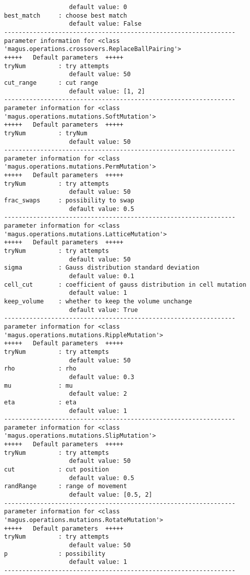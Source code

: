 \documentclass[12pt,oneside]{book}
\begin{document}
\begin{tcolorbox}
\begin{verbatim}
                  default value: 0
best_match     : choose best match
                  default value: False
----------------------------------------------------------------
parameter information for <class 'magus.operations.crossovers.ReplaceBallPairing'>
+++++	Default parameters	+++++
tryNum         : try attempts
                  default value: 50
cut_range      : cut range
                  default value: [1, 2]
----------------------------------------------------------------
parameter information for <class 'magus.operations.mutations.SoftMutation'>
+++++	Default parameters	+++++
tryNum         : tryNum
                  default value: 50
----------------------------------------------------------------
parameter information for <class 'magus.operations.mutations.PermMutation'>
+++++	Default parameters	+++++
tryNum         : try attempts
                  default value: 50
frac_swaps     : possibility to swap
                  default value: 0.5
----------------------------------------------------------------
parameter information for <class 'magus.operations.mutations.LatticeMutation'>
+++++	Default parameters	+++++
tryNum         : try attempts
                  default value: 50
sigma          : Gauss distribution standard deviation
                  default value: 0.1
cell_cut       : coefficient of gauss distribution in cell mutation
                  default value: 1
keep_volume    : whether to keep the volume unchange
                  default value: True
----------------------------------------------------------------
parameter information for <class 'magus.operations.mutations.RippleMutation'>
+++++	Default parameters	+++++
tryNum         : try attempts
                  default value: 50
rho            : rho
                  default value: 0.3
mu             : mu
                  default value: 2
eta            : eta
                  default value: 1
----------------------------------------------------------------
parameter information for <class 'magus.operations.mutations.SlipMutation'>
+++++	Default parameters	+++++
tryNum         : try attempts
                  default value: 50
cut            : cut position
                  default value: 0.5
randRange      : range of movement
                  default value: [0.5, 2]
----------------------------------------------------------------
parameter information for <class 'magus.operations.mutations.RotateMutation'>
+++++	Default parameters	+++++
tryNum         : try attempts
                  default value: 50
p              : possibility
                  default value: 1
----------------------------------------------------------------

\end{verbatim}
\end{tcolorbox}
\end{document}
